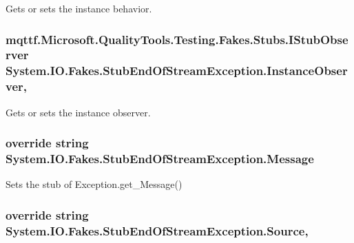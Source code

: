 Gets or sets the instance behavior.

\hypertarget{class_system_1_1_i_o_1_1_fakes_1_1_stub_end_of_stream_exception_ac9658d735c4a7242784d2b51b3f18a0e}{
\subsubsection[{Instance\-Observer}]{\setlength{\rightskip}{0pt plus 5cm}mqttf.\-Microsoft.\-Quality\-Tools.\-Testing.\-Fakes.\-Stubs.\-I\-Stub\-Observer System.\-I\-O.\-Fakes.\-Stub\-End\-Of\-Stream\-Exception.\-Instance\-Observer\hspace{0.3cm}{\ttfamily [get]}, {\ttfamily [set]}}}\label{class_system_1_1_i_o_1_1_fakes_1_1_stub_end_of_stream_exception_ac9658d735c4a7242784d2b51b3f18a0e}


Gets or sets the instance observer.

\hypertarget{class_system_1_1_i_o_1_1_fakes_1_1_stub_end_of_stream_exception_aef5f6ab889327ba44081ad71b62dddab}{
\subsubsection[{Message}]{\setlength{\rightskip}{0pt plus 5cm}override string System.\-I\-O.\-Fakes.\-Stub\-End\-Of\-Stream\-Exception.\-Message\hspace{0.3cm}{\ttfamily [get]}}}\label{class_system_1_1_i_o_1_1_fakes_1_1_stub_end_of_stream_exception_aef5f6ab889327ba44081ad71b62dddab}


Sets the stub of Exception.\-get\-\_\-\-Message()

\hypertarget{class_system_1_1_i_o_1_1_fakes_1_1_stub_end_of_stream_exception_a346e51ee621b2a01c0fef91ebe0d21a0}{
\subsubsection[{Source}]{\setlength{\rightskip}{0pt plus 5cm}override string System.\-I\-O.\-Fakes.\-Stub\-End\-Of\-Stream\-Exception.\-Source\hspace{0.3cm}{\ttfamily [get]}, {\ttfamily [set]}}}\label{class_system_1_1_i_o_1_1_fakes_1_1_stub_end_of_stream_exception_a346e51ee621b2a01c0fef91ebe0d21a0}


